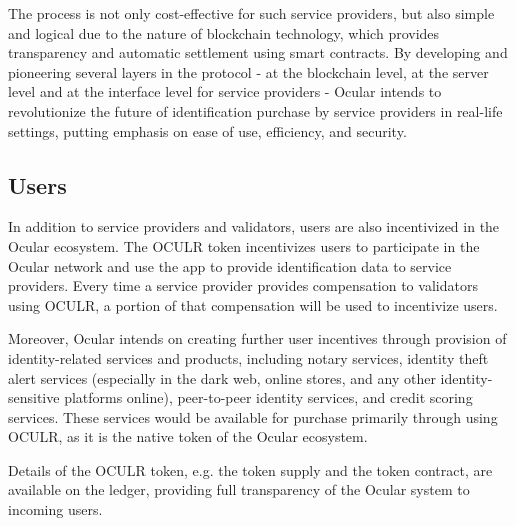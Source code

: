 \documentclass[a4paper]{article}
\begin{document}
The process is not only cost-effective for such service providers, but also simple and logical due to the nature of blockchain technology, which provides transparency and automatic settlement using smart contracts. By developing and pioneering several layers in the protocol - at the blockchain level, at the server level and at the interface level for service providers - Ocular intends to revolutionize the future of identification purchase by service providers in real-life settings, putting emphasis on ease of use, efficiency, and security.

\subsection{Users}
In addition to service providers and validators, users are also incentivized in the Ocular ecosystem. The OCULR token incentivizes users to participate in the Ocular network and use the app to provide identification data to service providers. Every time a service provider provides compensation to validators using OCULR, a portion of that compensation will be used to incentivize users.

Moreover, Ocular intends on creating further user incentives through provision of identity-related services and products, including notary services, identity theft alert services (especially in the dark web, online stores, and any other identity-sensitive platforms online), peer-to-peer identity services, and credit scoring services. These services would be available for purchase primarily through using OCULR, as it is the native token of the Ocular ecosystem.

Details of the OCULR token, e.g. the token supply and the token contract, are available on the ledger, providing full transparency of the Ocular system to incoming users. 
\end{document}
